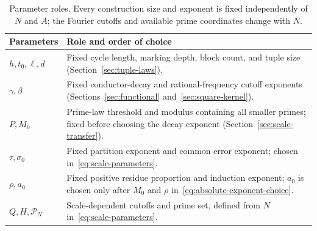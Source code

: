 \begin{table}[htbp]
\centering
\small
\begin{tabular}{@{}p{}p{}@{}}
\toprule
Parameters & Role and order of choice\\
\midrule
$h,t_0,\ell,d$ & Fixed cycle length, marking depth, block count, and tuple size
(Section~\ref{sec:tuple-laws}).\\[3pt]
$\gamma,\beta$ & Fixed conductor-decay and rational-frequency cutoff exponents
(Sections~\ref{sec:functional} and~\ref{sec:square-kernel}).\\[3pt]
$P,M_0$ & Prime-law threshold and modulus containing all smaller primes;
fixed before choosing the decay exponent
(Section~\ref{sec:scale-transfer}).\\[3pt]
$\tau,\sigma_0$ & Fixed partition exponent and common error exponent;
chosen in~\eqref{eq:scale-parameters}.\\[3pt]
$\rho,a_0$ & Fixed positive residue proportion and induction exponent;
$a_0$ is chosen only after $M_0$ and $\rho$ in~\eqref{eq:absolute-exponent-choice}.\\[3pt]
$Q,H,\mathcal P_N$ & Scale-dependent cutoffs and prime set, defined from $N$
in~\eqref{eq:scale-parameters}.\\
\bottomrule
\end{tabular}
\caption{Parameter roles. Every construction size and exponent is fixed
independently of $N$ and $A$; the Fourier cutoffs and available prime
coordinates change with $N$.}
\label{tab:parameter-roles}
\end{table}
